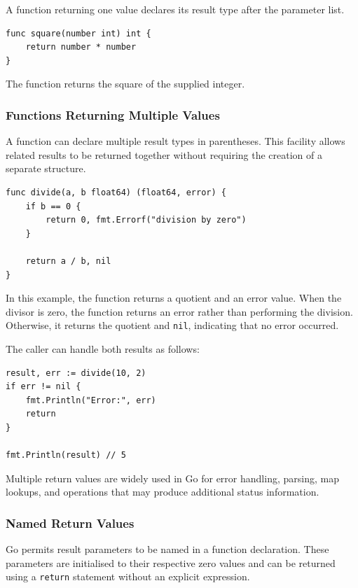 A function returning one value declares its result type after the parameter list.

\begin{lstlisting}
func square(number int) int {
    return number * number
}
\end{lstlisting}

The function returns the square of the supplied integer.

\subsubsection{Functions Returning Multiple Values}

A function can declare multiple result types in parentheses. This facility allows related results to be returned together without requiring the creation of a separate structure.

\begin{lstlisting}
func divide(a, b float64) (float64, error) {
    if b == 0 {
        return 0, fmt.Errorf("division by zero")
    }

    return a / b, nil
}
\end{lstlisting}

In this example, the function returns a quotient and an error value. When the divisor is zero, the function returns an error rather than performing the division. Otherwise, it returns the quotient and \texttt{nil}, indicating that no error occurred.

The caller can handle both results as follows:

\begin{lstlisting}
result, err := divide(10, 2)
if err != nil {
    fmt.Println("Error:", err)
    return
}

fmt.Println(result) // 5
\end{lstlisting}

Multiple return values are widely used in Go for error handling, parsing, map lookups, and operations that may produce additional status information.

\subsubsection{Named Return Values}

Go permits result parameters to be named in a function declaration. These parameters are initialised to their respective zero values and can be returned using a \texttt{return} statement without an explicit expression.

